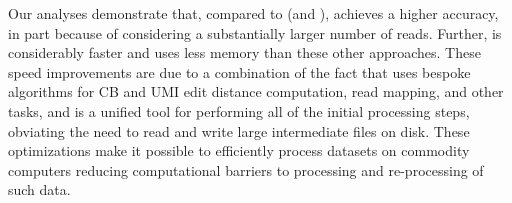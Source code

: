 Our analyses demonstrate that, compared to \cellr (and \naive), \alevin achieves
a higher accuracy, in part because of considering a substantially larger number
of reads. Further, \alevin is considerably faster and uses less memory than
these other approaches. These speed improvements are due to a combination of the
fact that \alevin uses bespoke algorithms for CB and UMI edit distance
computation, read mapping, and other tasks, and is a unified tool for performing
all of the initial processing steps, obviating the need to read and write large
intermediate files on disk. These optimizations make it possible to efficiently
process \dscrnaseq datasets on commodity computers reducing computational
barriers to processing and re-processing of such data.